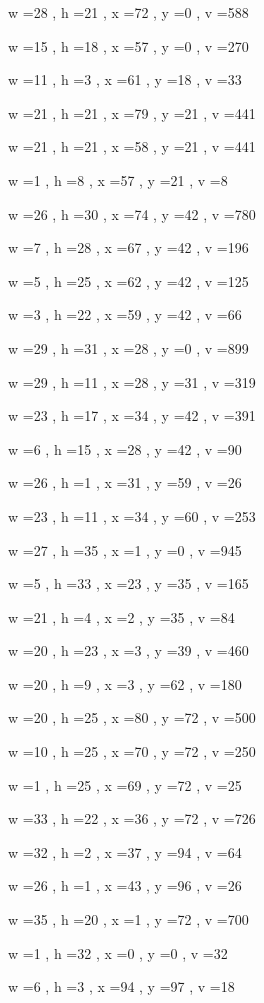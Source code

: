 \documentclass[11pt]{article}
\begin{document}
w =28 , h =21 , x =72 , y =0 , v =588
\par
w =15 , h =18 , x =57 , y =0 , v =270
\par
w =11 , h =3 , x =61 , y =18 , v =33
\par
w =21 , h =21 , x =79 , y =21 , v =441
\par
w =21 , h =21 , x =58 , y =21 , v =441
\par
w =1 , h =8 , x =57 , y =21 , v =8
\par
w =26 , h =30 , x =74 , y =42 , v =780
\par
w =7 , h =28 , x =67 , y =42 , v =196
\par
w =5 , h =25 , x =62 , y =42 , v =125
\par
w =3 , h =22 , x =59 , y =42 , v =66
\par
w =29 , h =31 , x =28 , y =0 , v =899
\par
w =29 , h =11 , x =28 , y =31 , v =319
\par
w =23 , h =17 , x =34 , y =42 , v =391
\par
w =6 , h =15 , x =28 , y =42 , v =90
\par
w =26 , h =1 , x =31 , y =59 , v =26
\par
w =23 , h =11 , x =34 , y =60 , v =253
\par
w =27 , h =35 , x =1 , y =0 , v =945
\par
w =5 , h =33 , x =23 , y =35 , v =165
\par
w =21 , h =4 , x =2 , y =35 , v =84
\par
w =20 , h =23 , x =3 , y =39 , v =460
\par
w =20 , h =9 , x =3 , y =62 , v =180
\par
w =20 , h =25 , x =80 , y =72 , v =500
\par
w =10 , h =25 , x =70 , y =72 , v =250
\par
w =1 , h =25 , x =69 , y =72 , v =25
\par
w =33 , h =22 , x =36 , y =72 , v =726
\par
w =32 , h =2 , x =37 , y =94 , v =64
\par
w =26 , h =1 , x =43 , y =96 , v =26
\par
w =35 , h =20 , x =1 , y =72 , v =700
\par
w =1 , h =32 , x =0 , y =0 , v =32
\par
w =6 , h =3 , x =94 , y =97 , v =18
\par
\newpage
\end{document}
